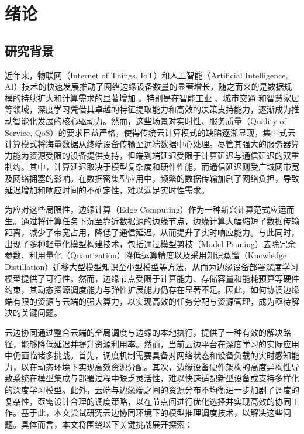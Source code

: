 
\chapter{绪论}

\section{研究背景}

近年来，物联网（Internet of Things, IoT）和人工智能（Artificial Intelligence, AI）技术的快速发展推动了网络边缘设备数量的显著增长，随之而来的是数据规模的持续扩大和计算需求的显著增加 \cite{chataut2023unleashing}。特别是在智能工业 \cite{elahi2023comprehensive, xu2022review, mohamed2019leveraging}、城市交通 \cite{almukhalfi2024traffic, sayed2023artificial} 和智慧家居 \cite{krejcar2020technology, 黄倩怡2020智能家居中的边缘计算, guo2019review} 等领域，深度学习凭借其卓越的特征提取能力和高效的决策支持能力，逐渐成为推动智能化发展的核心驱动力。然而，这些场景对实时性、服务质量（Quality of Service, QoS）的要求日益严格，使得传统云计算模式的缺陷逐渐显现\cite{andriulo2024edge}，集中式云计算模式将海量数据从终端设备传输至远端数据中心处理。尽管其强大的服务器算力能为资源受限的设备提供支持，但端到端延迟受限于计算延迟与通信延迟的双重制约\cite{wang2024end}。其中，计算延迟取决于模型复杂度和硬件性能，而通信延迟则受广域网带宽及网络拥塞的影响。在数据密集型应用中，频繁的数据传输加剧了网络负担，导致延迟增加和响应时间的不确定性，难以满足实时性需求\cite{xu2021modelling}。

为应对这些局限性，边缘计算（Edge Computing）作为一种新兴计算范式应运而生。通过将计算任务下沉至靠近数据源的边缘节点，边缘计算大幅缩短了数据传输距离，减少了带宽占用，降低了通信延迟，从而提升了实时响应能力\cite{chowdhury2019co,施巍松2019边缘计算}。与此同时，出现了多种轻量化模型构建技术，包括通过模型剪枝（Model Pruning）去除冗余参数\cite{han2015deep}、利用量化（Quantization）降低运算精度\cite{jacob2018quantization}以及采用知识蒸馏（Knowledge Distillation）迁移大型模型知识至小型模型\cite{hinton2015distilling}等方法，从而为边缘设备部署深度学习模型提供了可行性。然而，边缘节点受限于计算能力、存储容量和能耗预算等硬件约束，其动态资源调度能力与弹性扩展能力仍存在显著不足。因此，如何协调边缘端有限的资源与云端的强大算力，以实现高效的任务分配与资源管理，成为亟待解决的关键问题。

云边协同通过整合云端的全局调度与边缘的本地执行，提供了一种有效的解决路径，能够降低延迟并提升资源利用率。然而，当前云边平台在深度学习的实际应用中仍面临诸多挑战。首先，调度机制需要具备对网络状态和设备负载的实时感知能力，以在动态环境下实现高效资源分配。其次，边缘设备硬件架构的高度异构性导致系统在模型集成与部署过程中缺乏灵活性，难以快速适配新型设备或支持多样化的深度学习模型。此外，云端与边缘端之间的资源分布不均衡进一步加剧了调度的复杂性，亟需设计合理的调度策略，以在节点间进行优化选择并实现高效的协同工作。基于此，本文尝试研究云边协同环境下的模型推理调度技术，以解决这些问题。具体而言，本文将围绕以下关键挑战展开探索：


